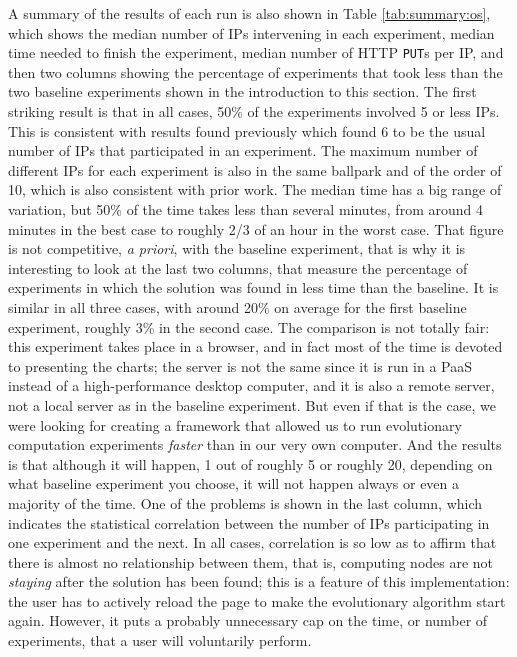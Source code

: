 \documentclass[journal,onecolumn]{IEEEtran}
\begin{document}
A summary of the results of each run is also shown in Table
\ref{tab:summary:os}, which shows the median number of IPs
intervening in each experiment,  median time needed
to finish the experiment, median number of HTTP {\tt PUT}s per IP, and
then two columns showing the percentage of experiments that took less
than the two baseline experiments shown in the introduction to this
section. The first striking result is that in all cases, 50\% of the
experiments involved 5 or less IPs. This is consistent with results
found previously \cite{DBLP:conf/gecco/GuervosG15} which found 6 to be
the usual number of IPs that participated in an experiment. The
maximum number of different IPs for each experiment is also in the
same ballpark and of the order of 10, which is also consistent with
prior work. The median time has a big range of variation, but 50\% of
the time takes less than several minutes, from around 4 minutes in the
best case to roughly 2/3 of an hour in the worst case. That figure is
not competitive, {\em a priori}, with the baseline experiment, that is
why it is interesting to look at the last two columns, that measure
the percentage of experiments in which the solution was found in less
time than the baseline. It is similar in all three cases, with around
20\% on average for the first baseline experiment, roughly 3\% in the
second case. The comparison is not totally fair: this experiment takes
place in a browser, and in fact most of the time is devoted to
presenting the charts; the server is not the same since it is run in a
PaaS instead of a high-performance desktop computer, and it is also a
remote server, not a local server as in the baseline experiment. But
even if that is the case, we were looking for creating a framework that
allowed us to run evolutionary computation experiments {\em faster} than
in our very own computer. And the results is that although it will
happen, 1 out of roughly 5 or roughly 20, depending on what baseline
experiment you choose, it will not happen always or even a majority of
the time. One of the problems is shown in the last column, which
indicates the statistical correlation between the number of IPs
participating in one experiment and the next. In all cases,
correlation is so low as to affirm that there is almost no
relationship between them, that is, computing nodes are not {\em
  staying} after the solution has been found; this is a feature of
this implementation: the user has to actively reload the page to make
the evolutionary algorithm start again. However, it puts a probably
unnecessary cap on the time, or number of experiments, that a user
will voluntarily perform.
\end{document}
